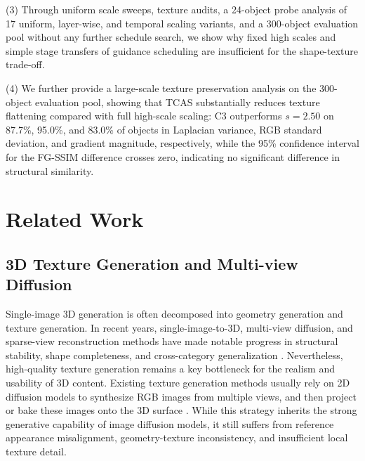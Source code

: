 \documentclass[times,twocolumn,final]{elsarticle}
\begin{document}
(3) Through uniform scale sweeps, texture audits, a 24-object probe analysis of 17 uniform, layer-wise, and temporal scaling variants, and a 300-object evaluation pool without any further schedule search, we show why fixed high scales and simple stage transfers of guidance scheduling are insufficient for the shape-texture trade-off.

(4) We further provide a large-scale texture preservation analysis on the 300-object evaluation pool, showing that TCAS substantially reduces texture flattening compared with full high-scale scaling: C3 outperforms $s = 2.50$ on 87.7\%, 95.0\%, and 83.0\% of objects in Laplacian variance, RGB standard deviation, and gradient magnitude, respectively, while the 95\% confidence interval for the FG-SSIM difference crosses zero, indicating no significant difference in structural similarity.

\section{Related Work}
\label{sec:related}

\subsection{3D Texture Generation and Multi-view Diffusion}
\label{subsec:3dtex}

Single-image 3D generation is often decomposed into geometry generation and texture generation. In recent years, single-image-to-3D, multi-view diffusion, and sparse-view reconstruction methods have made notable progress in structural stability, shape completeness, and cross-category generalization \cite{liu2023zero1to3,shi2023zero123pp,liu2023syncdreamer,long2023wonder3d,shi2024mvdream,wang2023imagedream,xu2024instantmesh,ke2024era3d}. Nevertheless, high-quality texture generation remains a key bottleneck for the realism and usability of 3D content. Existing texture generation methods usually rely on 2D diffusion models to synthesize RGB images from multiple views, and then project or bake these images onto the 3D surface \cite{chen2023text2tex,richardson2023texture,poole2023dreamfusion,chen2023fantasia3d}. While this strategy inherits the strong generative capability of image diffusion models, it still suffers from reference appearance misalignment, geometry-texture inconsistency, and insufficient local texture detail.
\end{document}
